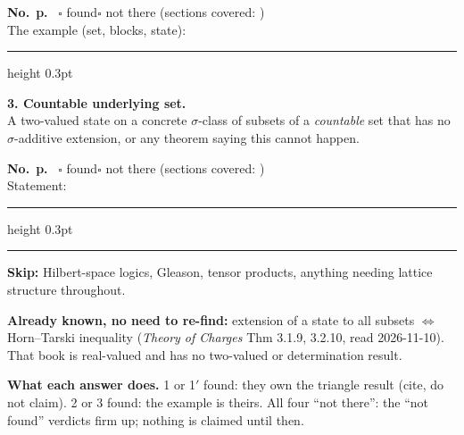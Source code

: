 \documentclass[10pt]{article}
\newcommand{\blank}[1]{\vspace{2pt}\hrule height 0.3pt\vspace{#1}}
\newcommand{\rec}{\textbf{No.}\ \underline{\hspace{2.2cm}}\quad \textbf{p.}\ \underline{\hspace{1.4cm}}\quad
  $\square$ found\quad $\square$ not there (sections covered: \underline{\hspace{3.2cm}})}
\begin{document}
\rec\\ The example (set, blocks, state):
\blank{1.6cm}

\textbf{3. Countable underlying set.}\\
A two-valued state on a concrete $\sigma$-class of subsets of a \emph{countable} set that has no
$\sigma$-additive extension, or any theorem saying this cannot happen.

\rec\\ Statement:
\blank{1.6cm}

\medskip\hrule\medskip
\textbf{Skip:} Hilbert-space logics, Gleason, tensor products, anything needing lattice structure throughout.

\textbf{Already known, no need to re-find:} extension of a state to all subsets $\iff$ Horn--Tarski inequality
(\emph{Theory of Charges} Thm 3.1.9, 3.2.10, read 2026-11-10). That book is real-valued and has no
two-valued or determination result.

\textbf{What each answer does.} 1 or 1$'$ found: they own the triangle result (cite, do not claim). 2 or 3 found:
the example is theirs. All four ``not there'': the ``not found'' verdicts firm up; nothing is claimed until then.
\end{document}
